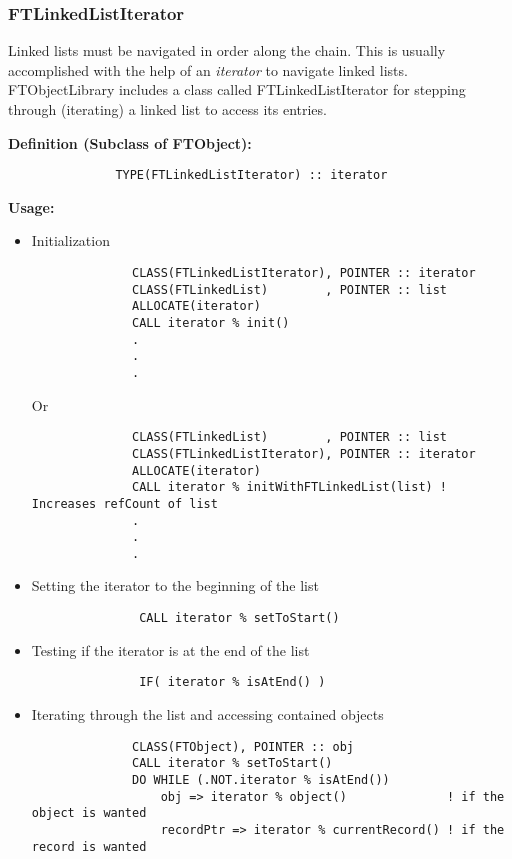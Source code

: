 \documentclass[9pt]{article}
\begin{document}
\subsubsection{FTLinkedListIterator}
Linked lists must be navigated in order along the chain. This is usually accomplished with the help of
an \emph{iterator} to navigate linked lists. FTObjectLibrary includes a class called FTLinkedListIterator for stepping through (iterating) a linked
list to access its entries.


      {\bf Definition (Subclass of FTObject):}
	{\color{blue}\begin{verbatim}
               TYPE(FTLinkedListIterator) :: iterator
	\end{verbatim}}
	
     { \bf Usage:}
\begin{itemize}
         \item Initialization

{\color{blue}\begin{verbatim}
              CLASS(FTLinkedListIterator), POINTER :: iterator
              CLASS(FTLinkedList)        , POINTER :: list
              ALLOCATE(iterator)
              CALL iterator % init()
              .
              .
              .
\end{verbatim}}
Or
{\color{blue}\begin{verbatim}
              CLASS(FTLinkedList)        , POINTER :: list
              CLASS(FTLinkedListIterator), POINTER :: iterator
              ALLOCATE(iterator)
              CALL iterator % initWithFTLinkedList(list) ! Increases refCount of list
              .
              .
              .
\end{verbatim}}

         \item Setting the iterator to the beginning of the list

{\color{blue}\begin{verbatim}
               CALL iterator % setToStart()
\end{verbatim}}

\item Testing if the iterator is at the end of the list

{\color{blue}\begin{verbatim}
               IF( iterator % isAtEnd() )
\end{verbatim}}

\item Iterating through the list and accessing contained objects
{\color{blue}\begin{verbatim}
              CLASS(FTObject), POINTER :: obj
              CALL iterator % setToStart()
              DO WHILE (.NOT.iterator % isAtEnd())
                  obj => iterator % object()              ! if the object is wanted
                  recordPtr => iterator % currentRecord() ! if the record is wanted
                  

\end{verbatim}}
\end{itemize}
\end{document}
